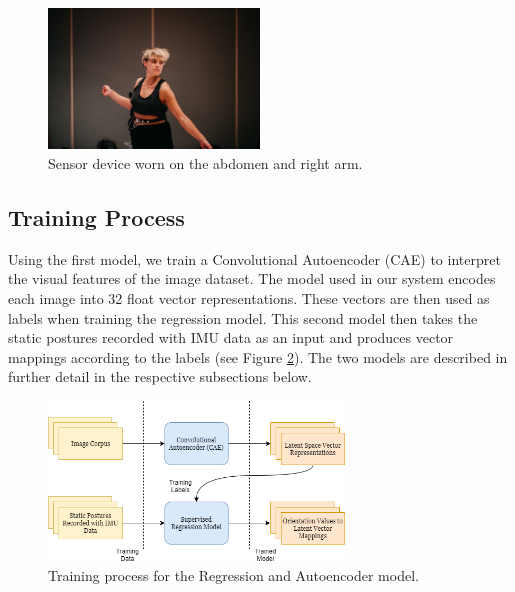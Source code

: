 
\begin{figure}[ht]
    \centering
    \includegraphics[width=0.5\textwidth]{Chapters/Figures/modi_dis/deva_imu_abdomen.jpg}
    \caption{Sensor device worn on the abdomen and right arm.}
    \label{fig:placement}
\end{figure}

\subsection*{Training Process}
\label{training_process}

Using the first model, we train a Convolutional Autoencoder (CAE) to interpret the visual features of the image dataset. The model used in our system encodes each image into 32 float vector representations. These vectors are then used as labels when training the regression model. This second model then takes the static postures recorded with IMU data as an input and produces vector mappings according to the labels (see Figure \ref{fig:training_fig}). The two models are described in further detail in the respective subsections below.

\begin{figure}[ht]
    \centering
    \includegraphics[width=0.7\textwidth]{Chapters/Figures/modi_dis/training_process.png}
    \caption{Training process for the Regression and Autoencoder model.}
    \label{fig:training_fig}
\end{figure}

